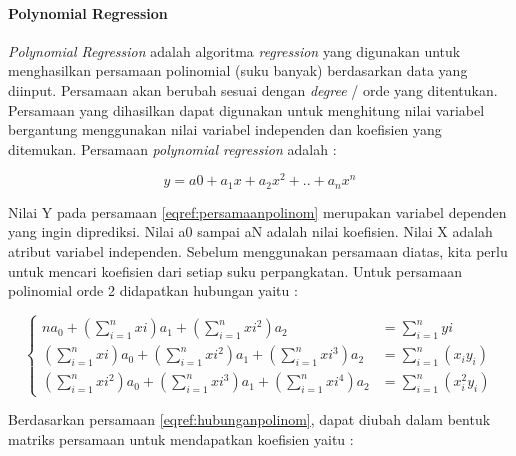 \documentclass[a4paper,twoside]{article}
\begin{document}
\begin{enumerate}
		
		\paragraph{\textbf{Polynomial Regression}}
 \textit{Polynomial Regression} adalah algoritma \textit{regression} yang digunakan untuk menghasilkan persamaan polinomial (suku banyak) berdasarkan data yang diinput. Persamaan  akan berubah sesuai dengan \textit{degree} / orde yang ditentukan. Persamaan yang dihasilkan dapat digunakan untuk menghitung nilai variabel bergantung menggunakan nilai variabel independen dan koefisien yang ditemukan. Persamaan \textit{polynomial regression} adalah : 
		
		
		\begin{equation}
		   y = a0 + a_1x + a_2x^2 + .. +  a_n x^n     
		   \label{eqref:persamaanpolinom}
		\end{equation}
		
		
Nilai Y pada persamaan \ref{eqref:persamaanpolinom} merupakan variabel dependen yang ingin diprediksi. Nilai a0 sampai aN adalah nilai koefisien. Nilai X adalah atribut variabel independen. Sebelum menggunakan persamaan diatas, kita perlu untuk mencari koefisien dari setiap suku perpangkatan. Untuk persamaan polinomial orde 2 didapatkan hubungan yaitu : 
		
		
		\begin{equation}
		\begin{cases}
		  
		   	na_0 + (\sum_{i=1}^{n}xi) a_1 + (\sum_{i=1}^{n}xi ^2)a_2 &= \sum_{i = 1}^{n} yi \\
		   		(\sum_{i=1}^{n}xi) a_0 + (\sum_{i=1}^{n}xi^2)a_1 + (\sum_{i=1}^{n} xi^3)a_2 &= \sum_{i=1}^{n} (x_i y_i) \\
		   		(\sum_{i=1}^{n} xi^2)a_0 + (\sum_{i=1}^{n} xi^3)a_1 + (\sum_{i=1}^{n}xi^4)a_2 &= \sum_{i=1}^{n}(x_i^2 y_i)
		   
		\end{cases}
		\label{eqref:hubunganpolinom}
	   \end{equation}
		
Berdasarkan persamaan \ref{eqref:hubunganpolinom}, dapat diubah dalam bentuk matriks persamaan untuk mendapatkan koefisien yaitu : 
		

\end{enumerate}
\end{document}
